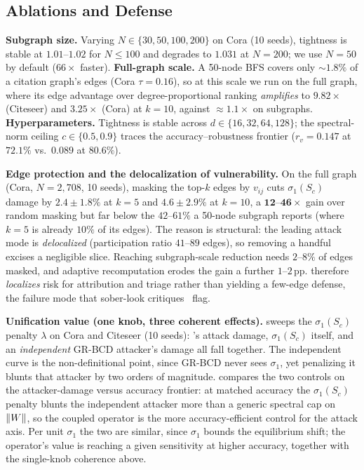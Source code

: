 \subsection{Ablations and Defense}
\label{app:ablations}
\textbf{Subgraph size.} Varying $N{\in}\{30,50,100,200\}$ on Cora (10 seeds), tightness is stable at
$1.01$--$1.02$ for $N{\le}100$ and degrades to $1.031$ at $N{=}200$; we use $N{=}50$ by default
($66\times$ faster). \textbf{Full-graph scale.} A 50-node BFS covers only ${\sim}1.8\%$ of a citation
graph's edges (Cora $\tau{=}0.16$), so at this scale we run \AEGIS on the full graph, where its edge
advantage over degree-proportional ranking \emph{amplifies} to $\mathbf{9.82\times}$ (Citeseer) and
$\mathbf{3.25\times}$ (Cora) at $k{=}10$, against ${\approx}1.1\times$ on subgraphs.
\textbf{Hyperparameters.} Tightness is stable across $d{\in}\{16,32,64,128\}$; the spectral-norm ceiling
$c{\in}\{0.5,0.9\}$ traces the accuracy--robustness frontier ($r_v{=}0.147$ at $72.1\%$ vs.\ $0.089$ at
$80.6\%$).

\textbf{Edge protection and the delocalization of vulnerability.} On the full graph (Cora, $N{=}2{,}708$,
10 seeds), masking the top-$k$ edges by $v_{ij}$ cuts $\sigma_1(S_c)$ damage by $2.4{\pm}1.8\%$ at
$k{=}5$ and $4.6{\pm}2.9\%$ at $k{=}10$, a $\mathbf{12}$--$\mathbf{46\times}$ gain over random masking but
far below the $42$--$61\%$ a 50-node subgraph reports (where $k{=}5$ is already $10\%$ of its edges). The
reason is structural: the leading attack mode is \emph{delocalized} (participation ratio $41$--$89$
edges), so removing a handful excises a negligible slice. Reaching subgraph-scale reduction needs
$2$--$8\%$ of edges masked, and adaptive recomputation erodes the gain a further $1$--$2$\,pp. \AEGIS
therefore \emph{localizes} risk for attribution and triage rather than yielding a few-edge defense, the
failure mode that sober-look critiques~\cite{mujkanovic2022defenses} flag.

\textbf{Unification value (one knob, three coherent effects).}  sweeps the
$\sigma_1(S_c)$ penalty $\lambda$ on Cora and Citeseer (10 seeds): \AEGIS's attack damage, $\sigma_1(S_c)$
itself, and an \emph{independent} GR-BCD attacker's damage all fall together. The independent curve is
the non-definitional point, since GR-BCD never sees $\sigma_1$, yet penalizing it blunts that attacker by
two orders of magnitude.  compares the two controls on the attacker-damage versus
accuracy frontier: at matched accuracy the $\sigma_1(S_c)$ penalty blunts the independent attacker more
than a generic spectral cap on $\left\|W\right\|$, so the coupled operator is the more accuracy-efficient control
for the attack axis. Per unit $\sigma_1$ the two are similar, since $\sigma_1$ bounds the equilibrium
shift; the operator's value is reaching a given sensitivity at higher accuracy, together with the
single-knob coherence above.


